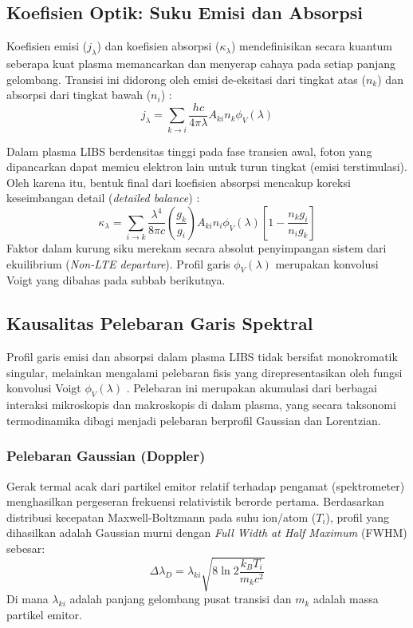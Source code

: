 \documentclass[10pt,leqno]{amsart}
\begin{document}
\subsection{Koefisien Optik: Suku Emisi dan Absorpsi}

Koefisien emisi ($j_\lambda$) dan koefisien absorpsi ($\kappa_\lambda$) mendefinisikan secara kuantum seberapa kuat plasma memancarkan dan menyerap cahaya pada setiap panjang gelombang. Transisi ini didorong oleh emisi de-eksitasi dari tingkat atas ($n_k$) dan absorpsi dari tingkat bawah ($n_i$) \cite{favre_merlin_2025}:
\begin{equation} \label{eq:emission_coeff}
j_\lambda = \sum_{k \to i} \frac{hc}{4\pi\lambda} A_{ki} n_k \phi_V(\lambda)
\end{equation}

Dalam plasma LIBS berdensitas tinggi pada fase transien awal, foton yang dipancarkan dapat memicu elektron lain untuk turun tingkat (emisi terstimulasi). Oleh karena itu, bentuk final dari koefisien absorpsi mencakup koreksi keseimbangan detail (\textit{detailed balance}) \cite{espinosa_analysis_2019}:
\begin{equation} \label{eq:absorption_coeff}
\kappa_\lambda = \sum_{i \to k} \frac{\lambda^4}{8\pi c} \left(\frac{g_k}{g_i}\right) A_{ki} n_i \phi_V(\lambda) \left[ 1 - \frac{n_k g_i}{n_i g_k} \right]
\end{equation}
Faktor dalam kurung siku merekam secara absolut penyimpangan sistem dari ekuilibrium (\textit{Non-LTE departure}). Profil garis $\phi_V(\lambda)$ merupakan konvolusi Voigt yang dibahas pada subbab berikutnya.

\subsection{Kausalitas Pelebaran Garis Spektral}

Profil garis emisi dan absorpsi dalam plasma LIBS tidak bersifat monokromatik singular, melainkan mengalami pelebaran fisis yang direpresentasikan oleh fungsi konvolusi Voigt $\phi_V(\lambda)$ \cite{tang_review_2024}. Pelebaran ini merupakan akumulasi dari berbagai interaksi mikroskopis dan makroskopis di dalam plasma, yang secara taksonomi termodinamika dibagi menjadi pelebaran berprofil Gaussian dan Lorentzian.

\subsubsection{Pelebaran Gaussian (Doppler)}
Gerak termal acak dari partikel emitor relatif terhadap pengamat (spektrometer) menghasilkan pergeseran frekuensi relativistik berorde pertama. Berdasarkan distribusi kecepatan Maxwell-Boltzmann pada suhu ion/atom ($T_i$), profil yang dihasilkan adalah Gaussian murni dengan \textit{Full Width at Half Maximum} (FWHM) sebesar:
\begin{equation} \label{eq:broadening_doppler}
\Delta\lambda_D = \lambda_{ki} \sqrt{8 \ln 2 \frac{k_B T_i}{m_k c^2}}
\end{equation}
Di mana $\lambda_{ki}$ adalah panjang gelombang pusat transisi dan $m_k$ adalah massa partikel emitor.
\end{document}
